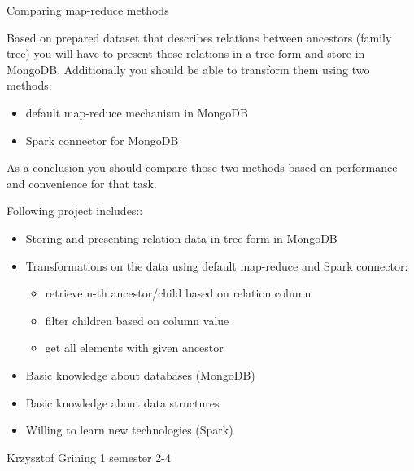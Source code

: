 \begin{project}
{Comparing map-reduce methods}
{
Based on prepared dataset that describes relations between ancestors (family tree) you will have to present those relations in a tree form and store in MongoDB. Additionally you should be able to transform them using two methods:
\begin{itemize}
	\item default map-reduce mechanism in MongoDB
	\item Spark connector for MongoDB
\end{itemize}
As a conclusion you should compare those two methods based on performance and convenience for that task.
}
{
Following project includes::
\begin{itemize}
	\item Storing and presenting relation data in tree form in MongoDB
	\item Transformations on the data using default map-reduce and Spark connector:
		\begin{itemize}
			\item retrieve n-th ancestor/child based on relation column
			\item filter children based on column value
			\item get all elements with given ancestor
	\end{itemize}
\end{itemize}
}
{
\begin{itemize}
	\item Basic knowledge about databases (MongoDB)
	\item Basic knowledge about data structures
	\item Willing to learn new technologies (Spark)
\end{itemize}
}
{Krzysztof Grining}
{1 semester}
{2-4}
\end{project}
